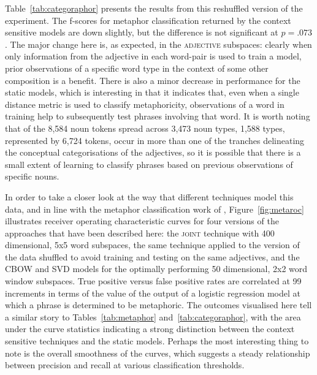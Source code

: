 Table~\ref{tab:categoraphor} presents the results from this reshuffled version of the experiment.  The f-scores for metaphor classification returned by the context sensitive models are down slightly, but the difference is not significant at $p = .073$.  The major change here is, as expected, in the \textsc{adjective} subspaces: clearly when only information from the adjective in each word-pair is used to train a model, prior observations of a specific word type in the context of some other composition is a benefit.  There is also a minor decrease in performance for the static models, which is interesting in that it indicates that, even when a single distance metric is used to classify metaphoricity, observations of a word in training help to subsequently test phrases involving that word.  It is worth noting that of the 8,584 noun tokens spread across 3,473 noun types, 1,588 types, represented by 6,724 tokens, occur in more than one of the tranches delineating the conceptual categorisations of the adjectives, so it is possible that there is a small extent of learning to classify phrases based on previous observations of specific nouns.

In order to take a closer look at the way that different techniques model this data, and in line with the metaphor classification work of \cite{TsvetkovEA2014}, Figure~\ref{fig:metaroc} illustrates receiver operating characteristic curves for four versions of the approaches that have been described here: the \textsc{joint} technique with 400 dimensional, 5x5 word subspaces, the same technique applied to the version of the data shuffled to avoid training and testing on the same adjectives, and the \textsc{CBOW} and \textsc{SVD} models for the optimally performing 50 dimensional, 2x2 word window subspaces.  True positive versus false positive rates are correlated at 99 increments in terms of the value of the output of a logistic regression model at which a phrase is determined to be metaphoric.  The outcomes visualised here tell a similar story to Tables~\ref{tab:metaphor} and~\ref{tab:categoraphor}, with the area under the curve statistics indicating a strong distinction between the context sensitive techniques and the static models.  Perhaps the most interesting thing to note is the overall smoothness of the curves, which suggests a steady relationship between precision and recall at various classification thresholds.

